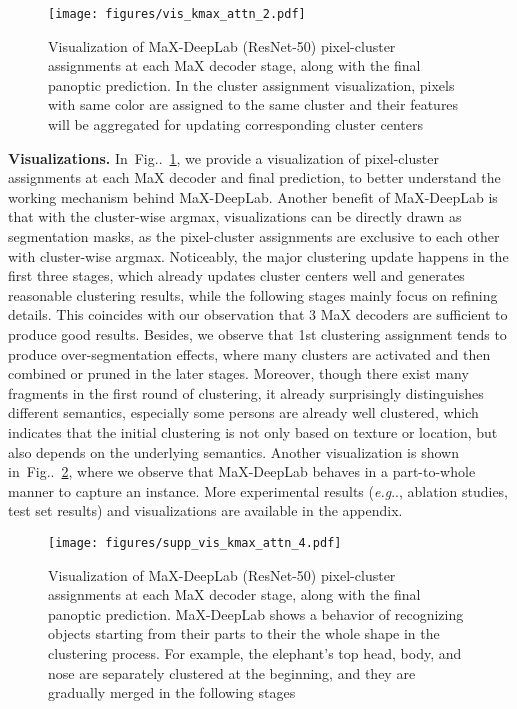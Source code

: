 \documentclass[runningheads]{llncs}
\makeatletter
\DeclareRobustCommand\onedot{\futurelet\@let@token\@onedot}
\def\@onedot{\ifx\@let@token.\else.\null\fi\xspace}
\def\eg{\emph{e.g}\onedot} \def\Eg{\emph{E.g}\onedot}
\newcommand{\figref}[1]{Fig\onedot~\ref{#1}}
\makeatother
\begin{document}
\begin{figure}[t]
    \centering
    \texttt{[image: figures/vis\_kmax\_attn\_2.pdf]}
    \caption{Visualization of MaX-DeepLab (ResNet-50) pixel-cluster assignments at each MaX decoder stage, along with the final panoptic prediction. In the cluster assignment visualization, pixels with same color are assigned to the same cluster and their features will be aggregated for updating corresponding cluster centers}
    \label{fig:vis_kmax}
\end{figure}

\textbf{Visualizations.}\quad 
In~\figref{fig:vis_kmax}, we provide a visualization of pixel-cluster assignments at each MaX decoder and final prediction, to better understand the working mechanism behind MaX-DeepLab. Another benefit of MaX-DeepLab is that with the cluster-wise argmax, visualizations can be directly drawn as segmentation masks, as the pixel-cluster assignments are exclusive to each other with cluster-wise argmax. Noticeably, the major clustering update happens in the first three stages, which already updates cluster centers well and generates reasonable clustering results, while the following stages mainly focus on refining details. This coincides with our observation that 3 MaX decoders are sufficient to produce good results. Besides, we observe that 1st clustering assignment tends to produce over-segmentation effects, where many clusters are activated and then combined or pruned in the later stages. Moreover, though there exist many fragments in the first round of clustering, it already surprisingly distinguishes different semantics, especially some persons are already well clustered, which indicates that the initial clustering is not only based on texture or location, but also depends on the underlying semantics. Another visualization is shown in~\figref{fig:supp_vis_kmax_4}, where we observe that MaX-DeepLab behaves in a part-to-whole manner to capture an instance. More experimental results (\eg, ablation studies, test set results) and visualizations are available in the appendix.

\begin{figure}[t]
    \centering
    \texttt{[image: figures/supp\_vis\_kmax\_attn\_4.pdf]}
    \caption{
    Visualization of MaX-DeepLab (ResNet-50) pixel-cluster assignments at each MaX decoder stage, along with the final panoptic prediction. MaX-DeepLab shows a behavior of recognizing objects starting from their parts to their the whole shape in the clustering process. For example, the elephant's top head, body, and nose are separately clustered at the beginning, and they are gradually merged in the following stages}
    \label{fig:supp_vis_kmax_4}
\end{figure}
\end{document}
